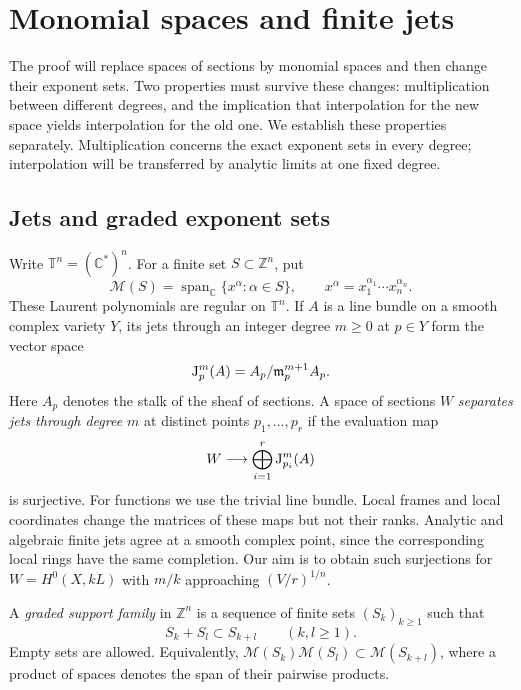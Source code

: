 \section{Monomial spaces and finite jets}
\label{sec:transfers}

The proof will replace spaces of sections by monomial spaces and then change their exponent sets. Two properties must survive these changes: multiplication between different degrees, and the implication that interpolation for the new space yields interpolation for the old one. We establish these properties separately. Multiplication concerns the exact exponent sets in every degree; interpolation will be transferred by analytic limits at one fixed degree.

\subsection{Jets and graded exponent sets}

Write $\mathbb{T}^n=(\mathbb{C}^*)^n$. For a finite set $S\subset\mathbb{Z}^n$, put
\[
 \mathcal{M}(S)=\operatorname{span}_{\mathbb{C}}\{x^\alpha:\alpha\in S\},
 \qquad x^\alpha=x_1^{\alpha_1}\cdots x_n^{\alpha_n}.
\]
These Laurent polynomials are regular on $\mathbb{T}^n$. If $A$ is a line bundle on a smooth complex variety $Y$, its jets through an integer degree $m\geq0$ at $p\in Y$ form the vector space
\[
 \mathrm J_p^m(A)
 =A_p/\mathfrak{m}_p^{m+1}A_p.
\]
Here $A_p$ denotes the stalk of the sheaf of sections. A space of sections $W$ \emph{separates jets through degree $m$} at distinct points $p_1,\ldots,p_r$ if the evaluation map
\[
 W\longrightarrow\bigoplus_{i=1}^r\mathrm J_{p_i}^m(A)
\]
is surjective. For functions we use the trivial line bundle. Local frames and local coordinates change the matrices of these maps but not their ranks. Analytic and algebraic finite jets agree at a smooth complex point, since the corresponding local rings have the same completion. Our aim is to obtain such surjections for $W=H^0(X,kL)$ with $m/k$ approaching $(V/r)^{1/n}$.

\begin{definition}\label{def:graded-support}
A \emph{graded support family} in $\mathbb{Z}^n$ is a sequence of finite sets $(S_k)_{k\geq1}$ such that
\begin{equation}\label{eq:graded-support}
 S_k+S_l\subset S_{k+l}\qquad(k,l\geq1).
\end{equation}
Empty sets are allowed. Equivalently, $\mathcal{M}(S_k)\mathcal{M}(S_l)\subset\mathcal{M}(S_{k+l})$, where a product of spaces denotes the span of their pairwise products.
\end{definition}

